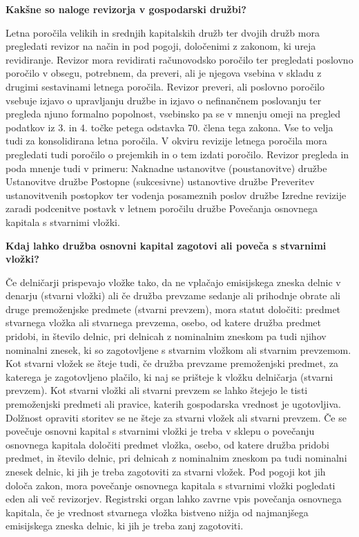 \documentclass[a4paper,12pt,openright]{book}
\begin{document}
\textbf{Kakšne so naloge revizorja v gospodarski družbi?}

Letna poročila velikih in srednjih kapitalskih družb ter dvojih družb mora pregledati revizor na način in pod pogoji, določenimi z zakonom, ki ureja revidiranje. Revizor mora revidirati računovodsko poročilo ter pregledati poslovno poročilo v obsegu, potrebnem, da preveri, ali je njegova vsebina v skladu z drugimi sestavinami letnega poročila. Revizor preveri, ali poslovno poročilo vsebuje izjavo o upravljanju družbe in izjavo o nefinančnem poslovanju ter pregleda njuno formalno popolnost, vsebinsko pa se v mnenju omeji na pregled podatkov iz 3. in 4. točke petega odstavka 70. člena tega zakona. Vse to velja tudi za konsolidirana letna poročila.
V okviru revizije letnega poročila mora pregledati tudi poročilo o prejemkih in o tem izdati poročilo.
Revizor pregleda in poda mnenje tudi v primeru:
Naknadne ustanovitve (poustanovitve) družbe
Ustanovitve družbe
Postopne (sukcesivne) ustanovtive družbe
Preveritev ustanovitvenih postopkov ter vodenja posameznih poslov družbe
Izredne revizije zaradi podcenitve postavk v letnem poročilu družbe
Povečanja osnovnega kapitala s stvarnimi vložki.

\textbf{Kdaj lahko družba osnovni kapital zagotovi ali poveča s stvarnimi vložki?}

Če delničarji prispevajo vložke tako, da ne vplačajo emisijskega zneska delnic v denarju (stvarni vložki) ali če družba prevzame sedanje ali prihodnje obrate ali druge premoženjske predmete (stvarni prevzem), mora statut določiti: predmet stvarnega vložka ali stvarnega prevzema, osebo, od katere družba predmet pridobi, in število delnic, pri delnicah z nominalnim zneskom pa tudi njihov nominalni znesek, ki so zagotovljene s stvarnim vložkom ali stvarnim prevzemom. Kot stvarni vložek se šteje tudi, če družba prevzame premoženjski predmet, za katerega je zagotovljeno plačilo, ki naj se prišteje k vložku delničarja (stvarni prevzem). Kot stvarni vložki ali stvarni prevzem se lahko štejejo le tisti premoženjski predmeti ali pravice, katerih gospodarska vrednost je ugotovljiva. Dolžnost opraviti storitev se ne šteje za stvarni vložek ali stvarni prevzem.
Če se povečuje osnovni kapital s stvarnimi vložki je treba v sklepu o povečanju osnovnega kapitala določiti predmet vložka, osebo, od katere družba pridobi predmet, in število delnic, pri delnicah z nominalnim zneskom pa tudi nominalni znesek delnic, ki jih je treba zagotoviti za stvarni vložek. Pod pogoji kot jih določa zakon, mora povečanje osnovnega kapitala s stvarnimi vložki pogledati eden ali več revizorjev.
Registrski organ lahko zavrne vpis povečanja osnovnega kapitala, če je vrednost stvarnega vložka bistveno nižja od najmanjšega emisijskega zneska delnic, ki jih je treba zanj zagotoviti.
\end{document}
